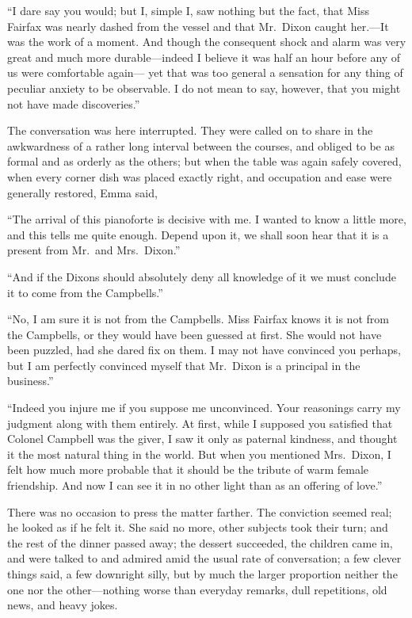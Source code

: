 ``I dare say you would; but I, simple I, saw nothing but the fact,
that Miss Fairfax was nearly dashed from the vessel and that Mr.\ Dixon
caught her.---It was the work of a moment.  And though the consequent
shock and alarm was very great and much more durable---indeed I
believe it was half an hour before any of us were comfortable again---%
yet that was too general a sensation for any thing of peculiar
anxiety to be observable.  I do not mean to say, however, that you
might not have made discoveries.''

The conversation was here interrupted.  They were called on to share
in the awkwardness of a rather long interval between the courses,
and obliged to be as formal and as orderly as the others; but when
the table was again safely covered, when every corner dish was placed
exactly right, and occupation and ease were generally restored,
Emma said,

``The arrival of this pianoforte is decisive with me.  I wanted to know
a little more, and this tells me quite enough.  Depend upon it,
we shall soon hear that it is a present from Mr.\ and Mrs.\ Dixon.''

``And if the Dixons should absolutely deny all knowledge of it we
must conclude it to come from the Campbells.''

``No, I am sure it is not from the Campbells.  Miss Fairfax knows it
is not from the Campbells, or they would have been guessed at first.
She would not have been puzzled, had she dared fix on them.
I may not have convinced you perhaps, but I am perfectly convinced
myself that Mr.\ Dixon is a principal in the business.''

``Indeed you injure me if you suppose me unconvinced.  Your reasonings
carry my judgment along with them entirely.  At first, while I
supposed you satisfied that Colonel Campbell was the giver, I saw
it only as paternal kindness, and thought it the most natural thing
in the world.  But when you mentioned Mrs.\ Dixon, I felt how much more
probable that it should be the tribute of warm female friendship.
And now I can see it in no other light than as an offering of love.''

There was no occasion to press the matter farther.  The conviction
seemed real; he looked as if he felt it.  She said no more,
other subjects took their turn; and the rest of the dinner passed away;
the dessert succeeded, the children came in, and were talked
to and admired amid the usual rate of conversation; a few clever
things said, a few downright silly, but by much the larger proportion
neither the one nor the other---nothing worse than everyday remarks,
dull repetitions, old news, and heavy jokes.

